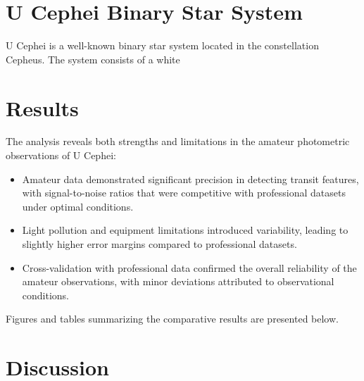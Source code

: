 \documentclass[12pt,a4paper]{article}
\begin{document}
\section{U Cephei Binary Star System}
U Cephei is a well-known binary star system located in the constellation Cepheus. The system consists of a white 
\section{Results}
The analysis reveals both strengths and limitations in the amateur photometric observations of U Cephei:
\begin{itemize}
    \item Amateur data demonstrated significant precision in detecting transit features, with signal-to-noise ratios that were competitive with professional datasets under optimal conditions.
    \item Light pollution and equipment limitations introduced variability, leading to slightly higher error margins compared to professional datasets.
    \item Cross-validation with professional data confirmed the overall reliability of the amateur observations, with minor deviations attributed to observational conditions.
\end{itemize}
Figures and tables summarizing the comparative results are presented below.

\section{Discussion}

\end{document}
